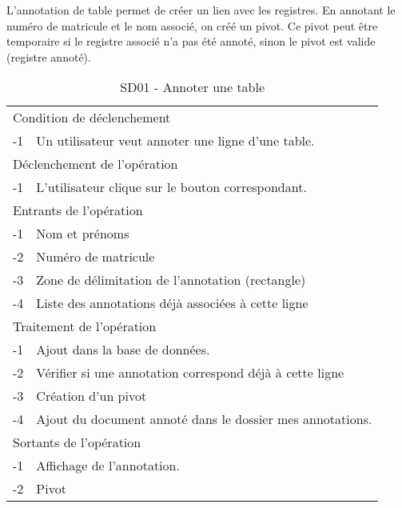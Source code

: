 \documentclass[a4paper]{article}
\begin{document}
L'annotation de table permet de cr\'eer un lien avec les registres. En annotant le num\'ero de matricule et le nom associ\'e, on cr\'e\'e un pivot. Ce pivot peut \^etre temporaire si le registre associ\'e n'a pas \'et\'e annot\'e, sinon le pivot est valide (registre annot\'e).\\

\begin{table}[H]
  \centering
   \small
	\begin{tabular}{|c|p{12cm}|}
   		\hline
   			\rowcolor{lightgray}\multicolumn{2}{|c|}{\textbf{SD01 - Annoter une table}} \\
   		\hline
   			\multicolumn{2}{|l|}{Condition de d\'eclenchement} \\
   		\hline
   		-1 & Un utilisateur veut annoter une ligne d'une table. \\
   		\hline
   			\multicolumn{2}{|l|}{D\'eclenchement de l'op\'eration} \\
   		\hline
   			-1 & L'utilisateur clique sur le bouton correspondant. \\
   		\hline
   			\multicolumn{2}{|l|}{Entrants de l'op\'eration} \\
   		\hline
   			-1 & Nom et pr\'enoms \\
        	-2 & Num\'ero de matricule \\ 
        	-3 & Zone de d\'elimitation de l'annotation (rectangle) \\
            -4 & Liste des annotations d\'ej\`a associ\'ees \`a cette ligne \\
   		\hline
   			\multicolumn{2}{|l|}{Traitement de l'op\'eration} \\
  		\hline
   			-1 & Ajout dans la base de donn\'ees. \\
        	-2 & V\'erifier si une annotation correspond d\'ej\`a \`a cette ligne \\
        	-3 & Cr\'eation d'un pivot \\
            -4 & Ajout du document annot\'e dans le dossier mes annotations. \\
   		\hline
   			\multicolumn{2}{|l|}{Sortants de l'op\'eration} \\
   		\hline
   			-1 & Affichage de l'annotation. \\
            -2 & Pivot \\
   		\hline
	\end{tabular}
  \caption{SD01 - Annoter une table}
  \normalsize
  \label{tab:annoter_table}
\end{table}
\end{document}
